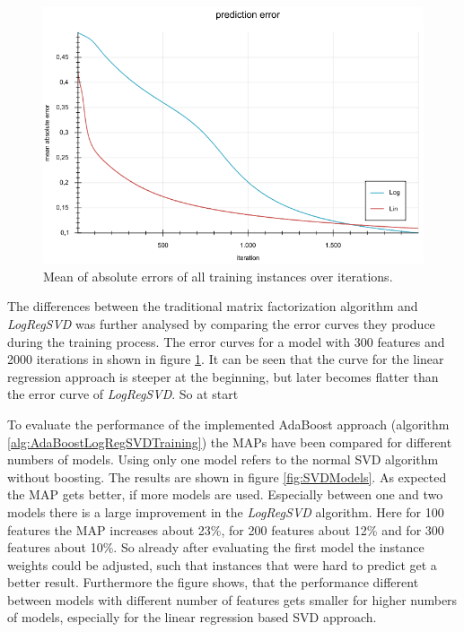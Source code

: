 \documentclass[10pt]{reportMaster}
\begin{document}
\begin{figure}
	\centering
	\includegraphics[width=1\textwidth]{figures/experiments/errorsLogLin43}
	\caption{Mean of absolute errors of all training instances over iterations.}
	\label{fig:errorsLogLin43}
\end{figure}

The differences between the traditional matrix factorization algorithm and \textit{LogRegSVD} was further analysed by comparing the error curves they produce during the training process.
The error curves for a model with 300 features and 2000 iterations in shown in figure \ref{fig:errorsLogLin43}.
It can be seen that the curve for the linear regression approach is steeper at the beginning, but later becomes flatter than the error curve of \textit{LogRegSVD}.
So at start 




To evaluate the performance of the implemented AdaBoost approach (algorithm \ref{alg:AdaBoostLogRegSVDTraining}) the MAPs have been compared for different numbers of models.
Using only one model refers to the normal SVD algorithm without boosting.
The results are shown in figure \ref{fig:SVDModels}.
As expected the MAP gets better, if more models are used.
Especially between one and two models there is a large improvement in the \textit{LogRegSVD} algorithm.
Here for 100 features the MAP increases about 23\%, for 200 features about 12\% and for 300 features about 10\%.
So already after evaluating the first model the instance weights could be adjusted, such that instances that were hard to predict get a better result. 
Furthermore the figure shows, that the performance different between models with different number of features gets smaller for higher numbers of models, especially for the linear regression based SVD approach.
\end{document}
